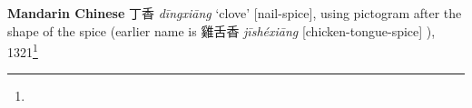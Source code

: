 \begin{etymology}\label{ety:dingxiang}
\textbf{Mandarin Chinese} {丁香} \textit{dīngxiāng} `clove' [nail-spice], using pictogram after the shape of the spice (earlier name is 雞舌香 \textit{jīshéxiāng} [chicken-tongue-spice]  ), 1321\footnote{}
\end{etymology}